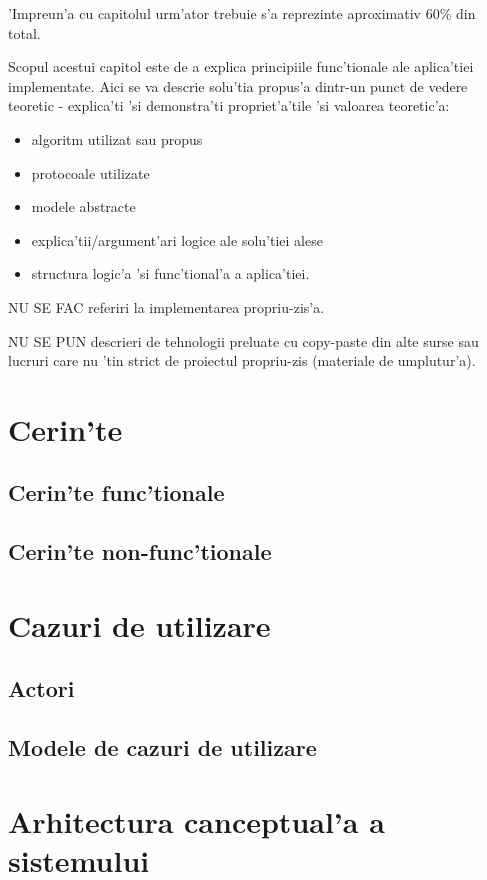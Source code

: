 \documentclass[12pt,a4paper,twoside]{report}
\begin{document}
'Impreun'a cu capitolul urm'ator trebuie s'a reprezinte aproximativ 60\% din total.

Scopul acestui capitol este de a explica principiile func'tionale ale aplica'tiei implementate. 
Aici se va descrie solu'tia propus'a dintr-un punct de vedere teoretic - explica'ti 'si demonstra'ti propriet'a'tile 'si valoarea teoretic'a:
\begin{itemize}
 \item algoritm utilizat sau propus
\item protocoale utilizate
\item modele abstracte
\item explica'tii/argument'ari logice ale solu'tiei alese
\item structura logic'a 'si func'tional'a a aplica'tiei.
\end{itemize}

{\color{red}
NU SE FAC referiri la implementarea propriu-zis'a. 

NU SE PUN descrieri de tehnologii preluate cu copy-paste din alte surse sau lucruri care nu 'tin strict de proiectul propriu-zis (materiale de umplutur'a).
}


\section{Cerin'te}
\subsection{Cerin'te func'tionale}
\subsection{Cerin'te non-func'tionale}
\section{Cazuri de utilizare}
\subsection{Actori}
\subsection{Modele de cazuri de utilizare}
\section{Arhitectura canceptual'a a sistemului}
\end{document}

